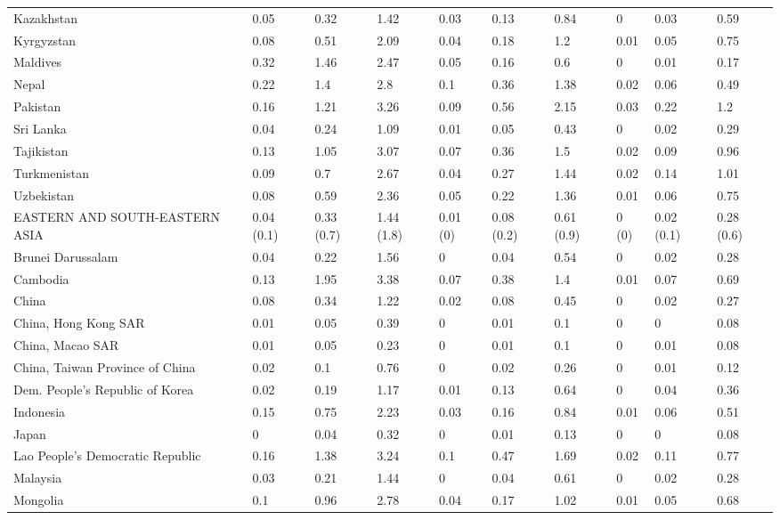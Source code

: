 \begin{longtable}[t]{llllllllll}
Kazakhstan & 0.05 & 0.32 & 1.42 & 0.03 & 0.13 & 0.84 & 0 & 0.03 & 0.59\\
Kyrgyzstan & 0.08 & 0.51 & 2.09 & 0.04 & 0.18 & 1.2 & 0.01 & 0.05 & 0.75\\
Maldives & 0.32 & 1.46 & 2.47 & 0.05 & 0.16 & 0.6 & 0 & 0.01 & 0.17\\
Nepal & 0.22 & 1.4 & 2.8 & 0.1 & 0.36 & 1.38 & 0.02 & 0.06 & 0.49\\
Pakistan & 0.16 & 1.21 & 3.26 & 0.09 & 0.56 & 2.15 & 0.03 & 0.22 & 1.2\\
Sri Lanka & 0.04 & 0.24 & 1.09 & 0.01 & 0.05 & 0.43 & 0 & 0.02 & 0.29\\
Tajikistan & 0.13 & 1.05 & 3.07 & 0.07 & 0.36 & 1.5 & 0.02 & 0.09 & 0.96\\
Turkmenistan & 0.09 & 0.7 & 2.67 & 0.04 & 0.27 & 1.44 & 0.02 & 0.14 & 1.01\\
Uzbekistan & 0.08 & 0.59 & 2.36 & 0.05 & 0.22 & 1.36 & 0.01 & 0.06 & 0.75\\
EASTERN AND SOUTH-EASTERN ASIA & 0.04 (0.1) & 0.33 (0.7) & 1.44 (1.8) & 0.01 (0) & 0.08 (0.2) & 0.61 (0.9) & 0 (0) & 0.02 (0.1) & 0.28 (0.6)\\
Brunei Darussalam & 0.04 & 0.22 & 1.56 & 0 & 0.04 & 0.54 & 0 & 0.02 & 0.28\\
Cambodia & 0.13 & 1.95 & 3.38 & 0.07 & 0.38 & 1.4 & 0.01 & 0.07 & 0.69\\
China & 0.08 & 0.34 & 1.22 & 0.02 & 0.08 & 0.45 & 0 & 0.02 & 0.27\\
China, Hong Kong SAR & 0.01 & 0.05 & 0.39 & 0 & 0.01 & 0.1 & 0 & 0 & 0.08\\
China, Macao SAR & 0.01 & 0.05 & 0.23 & 0 & 0.01 & 0.1 & 0 & 0.01 & 0.08\\
China, Taiwan Province of China & 0.02 & 0.1 & 0.76 & 0 & 0.02 & 0.26 & 0 & 0.01 & 0.12\\
Dem. People's Republic of Korea & 0.02 & 0.19 & 1.17 & 0.01 & 0.13 & 0.64 & 0 & 0.04 & 0.36\\
Indonesia & 0.15 & 0.75 & 2.23 & 0.03 & 0.16 & 0.84 & 0.01 & 0.06 & 0.51\\
Japan & 0 & 0.04 & 0.32 & 0 & 0.01 & 0.13 & 0 & 0 & 0.08\\
Lao People's Democratic Republic & 0.16 & 1.38 & 3.24 & 0.1 & 0.47 & 1.69 & 0.02 & 0.11 & 0.77\\
Malaysia & 0.03 & 0.21 & 1.44 & 0 & 0.04 & 0.61 & 0 & 0.02 & 0.28\\
Mongolia & 0.1 & 0.96 & 2.78 & 0.04 & 0.17 & 1.02 & 0.01 & 0.05 & 0.68\\

\end{longtable}

